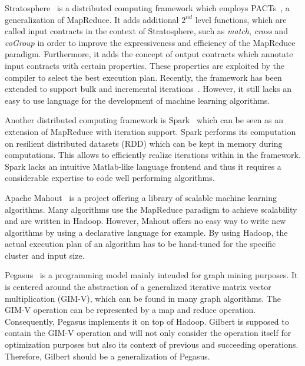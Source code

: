 Stratosphere~\cite{battre:2010a} is a distributed computing framework which employs PACTs~\cite{alexandrov:2011a}, a generalization of MapReduce.
It adds additional $2^{nd}$ level functions, which are called input contracts in the context of Stratosphere, such as \emph{match}, \emph{cross} and \emph{coGroup} in order to improve the expressiveness and efficiency of the MapReduce paradigm.
Furthermore, it adds the concept of output contracts which annotate input contracts with certain properties.
These properties are exploited by the compiler to select the best execution plan.
Recently, the framework has been extended to support bulk and incremental iterations~\cite{ewen:pve2012a}.
However, it still lacks an easy to use language for the development of machine learning algorithms.

Another distributed computing framework is Spark~\cite{zaharia:2010a} which can be seen as an extension of MapReduce with iteration support.
Spark performs its computation on resilient distributed datasets (RDD) which can be kept in memory during computations.
This allows to efficiently realize iterations within in the framework.
Spark lacks an intuitive Matlab-like language frontend and thus it requires a considerable expertise to code well performing algorithms.

Apache Mahout~\cite{mahout:2011a} is a project offering a library of scalable machine learning algorithms.
Many algorithms use the MapReduce paradigm to achieve scalability and are written in Hadoop.
However, Mahout offers no easy way to write new algorithms by using a declarative language for example.
By using Hadoop, the actual execution plan of an algorithm has to be hand-tuned for the specific cluster and input size.

Pegasus~\cite{kang:2009a} is a programming model mainly intended for graph mining purposes.
It is centered around the abstraction of a generalized iterative matrix vector multiplication (GIM-V), which can be found in many graph algorithms.
The GIM-V operation can be represented by a map and reduce operation.
Consequently, Pegasus implements it on top of Hadoop.
Gilbert is supposed to contain the GIM-V operation and will not only consider the operation itself for optimization purposes but also its context of previous and succeeding operations.
Therefore, Gilbert should be a generalization of Pegasus.

